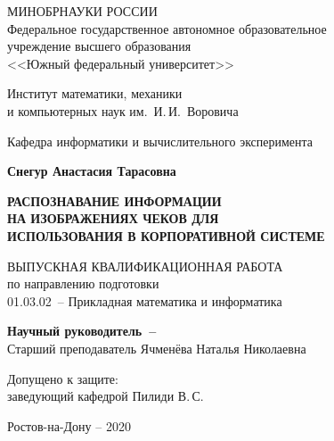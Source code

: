 


\thispagestyle{empty}
\begin{singlespacing}
\begin{center}

МИНОБРНАУКИ РОССИИ\\ [12pt]
Федеральное государственное автономное образовательное\\
учреждение высшего образования\\
<<Южный федеральный университет>>

\vspace{\baselineskip}
Институт математики, механики\\
и компьютерных наук им.~И.\,И.~Воровича

\vspace{\baselineskip}
Кафедра информатики и вычислительного эксперимента

\vfill
\textbf{Снегур Анастасия Тарасовна}

\vspace{\baselineskip}
{\bf РАСПОЗНАВАНИЕ ИНФОРМАЦИИ \\
НА ИЗОБРАЖЕНИЯХ ЧЕКОВ ДЛЯ \\
ИСПОЛЬЗОВАНИЯ В КОРПОРАТИВНОЙ СИСТЕМЕ }

\vspace{15mm}
ВЫПУСКНАЯ КВАЛИФИКАЦИОННАЯ РАБОТА\\
по направлению подготовки\\
01.03.02~-- Прикладная математика и информатика


\vspace{10mm}
\textbf{Научный руководитель~--}\\
Старший преподаватель Ячменёва Наталья Николаевна

\vspace{15mm}

\noindent
\begin{flushleft}
Допущено к защите:\\
заведующий кафедрой \underline{\hspace*{65mm}} Пилиди В.\,С.
\end{flushleft}




\vfill
Ростов-на-Дону -- 2020

\end{center}

\singlespacing
\end{singlespacing} 